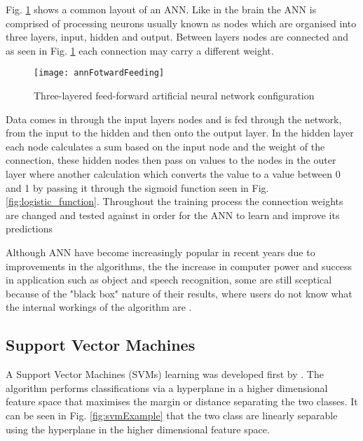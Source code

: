 Fig. \ref{fig:annFotwardFeeding} shows a common layout of an ANN. Like in the brain the ANN is comprised of processing neurons usually known as nodes which are organised into three layers, input, hidden and output. Between layers nodes are connected and as seen in Fig. \ref{fig:annFotwardFeeding} each connection may carry a different weight.

\begin{figure}[H]
	\texttt{[image: annFotwardFeeding]}
	\caption{Three-layered feed-forward artificial neural network configuration \\
				\cite[Source:][]{raju_development_2011}
			}
	\label{fig:annFotwardFeeding}
\end{figure}

Data comes in through the input layers nodes and is fed through the network, from the input to the hidden and then onto the output layer. In the hidden layer each node calculates a sum based on the input node and the weight of the connection, these hidden nodes then pass on values to the nodes in the outer layer where another calculation which converts the value to a value between 0 and 1 by passing it through the sigmoid function seen in Fig. \ref{fig:logistic_function}. Throughout the training process the connection weights are changed and tested against in order for the ANN to learn and improve its predictions \citep{haykin_neural_1998}

Although ANN have become increasingly popular in recent years due to improvements in the algorithms, the the increase in computer power and success in application such as object and speech recognition,  some are still sceptical because of the "black box" nature of their results, where users do not know what the internal workings of the algorithm are  \citep{kaastra_forecasting_1995}. 



\subsection{Support Vector Machines} \label{SVM}
A Support Vector Machines (SVMs) learning was developed first by \cite{vapnik_nature_1995}. The algorithm performs classifications via a hyperplane in a higher dimensional feature space that maximises the margin or distance separating the two classes. It can be seen in Fig. \ref{fig:svmExample} that the two class are linearly separable using the hyperplane in the higher dimensional feature space. 

